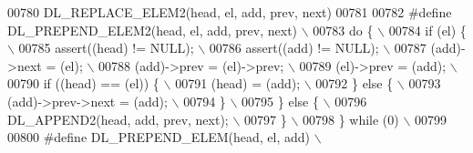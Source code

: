 \begin{DoxyCode}
00780 \textcolor{preprocessor}{    DL\_REPLACE\_ELEM2(head, el, add, prev, next)}
00781 
00782 \textcolor{preprocessor}{#define DL\_PREPEND\_ELEM2(head, el, add, prev, next)                                            \(\backslash\)}
00783 \textcolor{preprocessor}{do \{                                                                                           \(\backslash\)}
00784 \textcolor{preprocessor}{ if (el) \{                                                                                     \(\backslash\)}
00785 \textcolor{preprocessor}{  assert((head) != NULL);                                                                      \(\backslash\)}
00786 \textcolor{preprocessor}{  assert((add) != NULL);                                                                       \(\backslash\)}
00787 \textcolor{preprocessor}{  (add)->next = (el);                                                                          \(\backslash\)}
00788 \textcolor{preprocessor}{  (add)->prev = (el)->prev;                                                                    \(\backslash\)}
00789 \textcolor{preprocessor}{  (el)->prev = (add);                                                                          \(\backslash\)}
00790 \textcolor{preprocessor}{  if ((head) == (el)) \{                                                                        \(\backslash\)}
00791 \textcolor{preprocessor}{   (head) = (add);                                                                             \(\backslash\)}
00792 \textcolor{preprocessor}{  \} else \{                                                                                     \(\backslash\)}
00793 \textcolor{preprocessor}{   (add)->prev->next = (add);                                                                  \(\backslash\)}
00794 \textcolor{preprocessor}{  \}                                                                                            \(\backslash\)}
00795 \textcolor{preprocessor}{ \} else \{                                                                                      \(\backslash\)}
00796 \textcolor{preprocessor}{  DL\_APPEND2(head, add, prev, next);                                                           \(\backslash\)}
00797 \textcolor{preprocessor}{ \}                                                                                             \(\backslash\)}
00798 \textcolor{preprocessor}{\} while (0)                                                                                    \(\backslash\)}
00799 \textcolor{preprocessor}{}
00800 \textcolor{preprocessor}{#define DL\_PREPEND\_ELEM(head, el, add)                                                         \(\backslash\)}

\end{DoxyCode}
